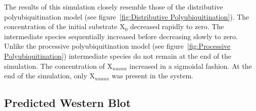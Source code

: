\documentclass[11pt]{article}
\begin{document}
The results of this simulation closely resemble those of the distributive polyubiquitination model (see figure~\ref{fig:Distributive Polyubiquitination}). The concentration of the initial substrate X$_0$ decreased rapidly to zero. The intermediate species sequentially increased before decreasing slowly to zero. Unlike the processive polyubiquitination model (see figure~\ref{fig:Processive Polyubiquitination}) intermediate species do not remain at the end of the simulation. The concentration of X$_{uuuuu}$ increased in a sigmoidal fashion. At the end of the simulation, only X$_{uuuuu}$ was present in the system. 

\subsection{Predicted Western Blot}

\end{document}
